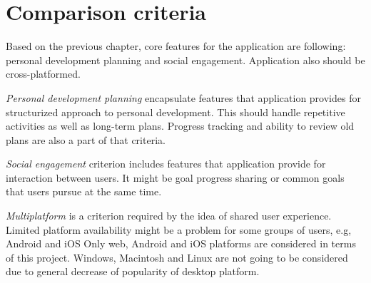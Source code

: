 
\section{Comparison criteria}\label{sec:comparison-criteria}



Based on the previous chapter, core features for the application are following: personal development planning and social engagement.
Application also should be cross-platformed.

\textit{Personal development planning} encapsulate features that application provides for structurized approach to personal development.
This should handle repetitive activities as well as long-term plans.
Progress tracking and ability to review old plans are also a part of that criteria.

\textit{Social engagement} criterion includes features that application provide for interaction between users.
It might be goal progress sharing or common goals that users pursue at the same time.

\textit{Multiplatform} is a criterion required by the idea of shared user experience.
Limited platform availability might be a problem for some groups of users, e.g, Android and iOS\@
Only web, Android and iOS platforms are considered in terms of this project.
Windows, Macintosh and Linux are not going to be considered due to general decrease of popularity of desktop platform.\cite{mobile-vs-desktop}

